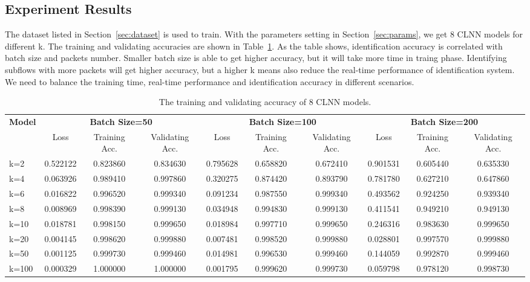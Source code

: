 \documentclass[conference]{IEEEtran}
\begin{document}
\subsection{Experiment Results}
\label{sec:experimentresults}
The dataset listed in Section~\ref{sec:dataset} is used to train. With the parameters setting in Section~\ref{sec:params}, we get 8 CLNN models for different k. The training and validating accuracies are shown in Table~\ref{tab:acc4models}. As the table shows, identification accuracy is correlated with batch size and packets number. Smaller batch size is able to get higher accuracy, but it will take more time in traing phase. Identifying subflows with more packets will get higher accuracy, but a higher k means also reduce the real-time performance of identification system. We need to balance the training time, real-time performance and identification accuracy in different scenarios.


\begin{table}[htp]
  \caption{The training and validating accuracy of 8 CLNN models.}
  \label{tab:acc4models}
  \centering
  \begin{tabular}{l c c c c c c c c c}
    \hline
    \multirow{2}{*}{\textbf{Model}} & \multicolumn{3}{c}{\textbf{Batch Size=50}} & \multicolumn{3}{c}{\textbf{Batch Size=100}}&\multicolumn{3}{c}{\textbf{Batch Size=200}}\\
    \cline{2-10}
    &Loss&Training Acc.&Validating Acc.&Loss&Training Acc.&Validating Acc.&Loss&Training Acc.&Validating Acc.\\
    \hline
    k=2      & 0.522122  & 0.823860  &0.834630 & 0.795628  & 0.658820  &0.672410 & 0.901531  & 0.605440  &0.635330  \\

    k=4      & 0.063926  & 0.989410  &0.997860& 0.320275  & 0.874420  &0.893790& 0.781780  & 0.627210  &0.647860 \\

    k=6      & 0.016822  & 0.996520  &0.999340& 0.091234  & 0.987550  &0.999340& 0.493562  & 0.924250  &0.939340 \\

    k=8      & 0.008969  & 0.998390  &0.999130& 0.034948  & 0.994830  &0.999130& 0.411541  & 0.949210  &0.949130 \\

    k=10     & 0.018781  & 0.998150  &0.999650& 0.018984  & 0.997710  &0.999650& 0.246316  & 0.983630  &0.999650  \\

    k=20     & 0.004145  & 0.998620  &0.999880& 0.007481  & 0.998520  &0.999880& 0.028801  & 0.997570  &0.999880 \\

    k=50     & 0.001125  & 0.999730  &0.999460& 0.014981  & 0.996530  &0.999460& 0.144059  & 0.992870  &0.999460  \\

    k=100    & 0.000329  & 1.000000  &1.000000& 0.001795  & 0.999620  &0.999730& 0.059798  & 0.978120  &0.998730  \\
    \hline
  \end{tabular}
\end{table}
\end{document}
